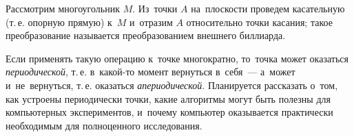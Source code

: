 


Рассмотрим многоугольник $M$.
Из точки $A$ на плоскости проведем касательную (т.\,е. опорную прямую) к $M$
и отразим $A$ относительно точки касания;
такое преобразование называется преобразованием внешнего биллиарда.

Если применять такую операцию к точке многократно, то точка может оказаться
\emph{периодической}, т.\,е. в какой-то момент вернуться в себя~--- а может
и не вернуться, т.\,е. оказаться \emph{апериодической}.
Планируется рассказать о том, как устроены периодически точки, какие алгоритмы
могут быть полезны для компьютерных экспериментов, и почему компьютер
оказывается практически необходимым для полноценного исследования.

